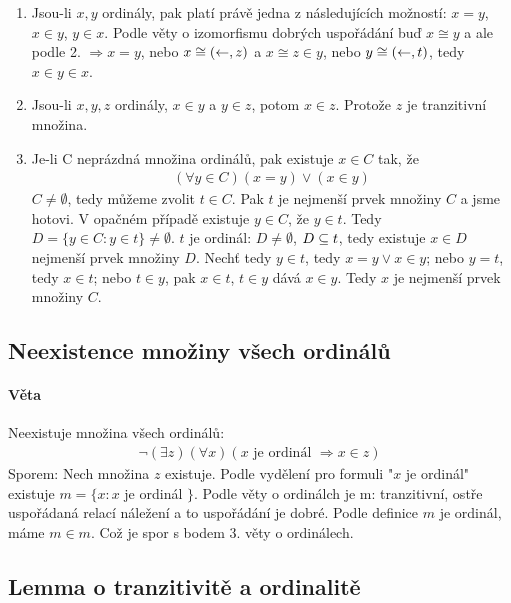 \documentclass[a4paper,12pt,titlepage]{article}
\begin{document}
\begin{enumerate}
	\item Jsou-li $x,y$ ordinály, pak platí právě jedna z následujících
	možností: $x = y$, $x \in y$, $y \in x$. Podle věty o izomorfismu dobrých
	uspořádání buď $x \cong y$ a ale podle 2. $\Rightarrow x = y$, nebo $x \cong
	(\leftarrow, z)$ a $x \cong z \in y$, nebo $y \cong (\leftarrow, t)$, tedy $x \in y \in x$.


	\item Jsou-li $x, y, z$ ordinály, $x \in y$ a $y \in z$, potom $x \in z$.
	Protože $z$ je tranzitivní množina.
	
	\item Je-li C neprázdná množina ordinálů, pak existuje $x \in C$ tak, že
	\begin{align}
		(\forall y \in C) (x = y) \lor (x \in y)
	\end{align}
	$C \neq \emptyset$, tedy můžeme zvolit  $t \in C$. Pak $t$ je nejmenší prvek
	množiny $C$ a jsme hotovi. V opačném případě existuje $y \in C$, že $y \in
	t$. Tedy $D = \{ y \in C : y \in t \} \neq \emptyset$. $t$ je ordinál: $D \neq
	\emptyset$, $D \subseteq t$, tedy existuje $x \in D$ nejmenší prvek množiny
	$D$. Nechť tedy $y \in t$, tedy $x = y \lor x \in y$; nebo $y = t$, tedy $x
	\in t$; nebo $t \in y$, pak $x \in t$, $t \in y$ dává $x \in y$. Tedy $x$ je nejmenší
	prvek množiny $C$.
\end{enumerate}


\subsection{Neexistence množiny všech ordinálů}
\setcounter{equation}{0}
\paragraph{Věta}
Neexistuje množina všech ordinálů:
\begin{align}
	\neg (\exists z) (\forall x) (x \text{ je ordinál } \Rightarrow x \in z)
\end{align}
Sporem: Nech množina $z$ existuje. Podle vydělení pro formuli "$x$ je ordinál"
existuje $m = \{ x :  x$ je ordinál $ \}$. Podle věty o ordinálch je m:
tranzitivní, ostře uspořádaná relací náležení a to uspořádání je dobré. Podle
definice $m$ je ordinál, máme $m \in m$. Což je spor s bodem 3. věty o
ordinálech.

\subsection{Lemma o tranzitivitě a ordinalitě}
\setcounter{equation}{0}
\end{document}
